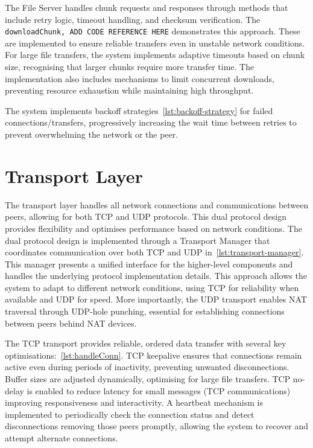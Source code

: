 \documentclass[12pt,a4paper]{report}
\begin{document}
The File Server handles chunk requests and responses through methods that include retry logic, timeout handling, and checksum verification. The \texttt{downloadChunk, ADD CODE REFERENCE HERE} demonstrates this approach. These are implemented to ensure reliable transfers even in unstable network conditions. For large file transfers, the system implements adaptive timeouts based on chunk size, recognising that larger chunks require more transfer time. The implementation also includes mechanisms to limit concurrent downloads, preventing resource exhaustion while maintaining high throughput.

The system implements backoff strategies~\ref{lst:backoff-strategy} for failed connections/transfers, progressively increasing the wait time between retries to prevent overwhelming the network or the peer.

\section{Transport Layer}

The transport layer handles all network connections and communications between peers, allowing for both TCP and UDP protocols. This dual protocol design provides flexibility and optimises performance based on network conditions. The dual protocol design is implemented through a Transport Manager that coordinates communication over both TCP and UDP in~\ref{lst:transport-manager}. This manager presents a unified interface for the higher-level components and handles the underlying protocol implementation details. This approach allows the system to adapt to different network conditions, using TCP for reliability when available and UDP for speed. More importantly, the UDP transport enables NAT traversal through UDP-hole punching, essential for establishing connections between peers behind NAT devices.

The TCP transport provides reliable, ordered data transfer with several key optimisations:~\ref{lst:handleConn}. TCP keepalive ensures that connections remain active even during periods of inactivity, preventing unwanted disconnections. Buffer sizes are adjusted dynamically, optimising for large file transfers. TCP no-delay is enabled to reduce latency for small messages (TCP communications) improving responsiveness and interactivity. A heartbeat mechanism is implemented to periodically check the connection status and detect disconnections removing those peers promptly, allowing the system to recover and attempt alternate connections.
\end{document}

